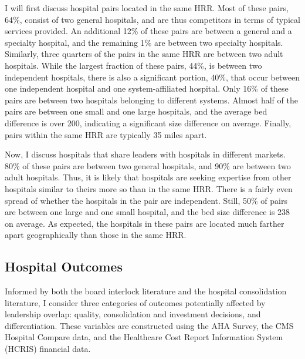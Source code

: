 \documentclass[12pt]{article}
\begin{document}
    I will first discuss hospital pairs located in the same HRR. Most of these pairs, 64\%, consist of two general hospitals, and are thus competitors in terms of typical services provided. An additional 12\% of these pairs are between a general and a specialty hospital, and the remaining 1\% are between two specialty hospitals. Similarly, three quarters of the pairs in the same HRR are between two adult hospitals. While the largest fraction of these pairs, 44\%, is between two independent hospitals, there is also a significant portion, 40\%, that occur between one independent hospital and one system-affiliated hospital. Only 16\% of these pairs are between two hospitals belonging to different systems. Almost half of the pairs are between one small and one large hospitals, and the average bed difference is over 200, indicating a significant size difference on average. Finally, pairs within the same HRR are typically 35 miles apart.

    Now, I discuss hospitals that share leaders with hospitals in different markets. 80\% of these pairs are between two general hospitals, and 90\% are between two adult hospitals. Thus, it is likely that hospitals are seeking expertise from other hospitals similar to theirs more so than in the same HRR. There is a fairly even spread of whether the hospitals in the pair are independent. Still, 50\% of pairs are between one large and one small hospital, and the bed size difference is 238 on average. As expected, the hospitals in these pairs are located much farther apart geographically than those in the same HRR. 

    \subsection{Hospital Outcomes}\label{sec:outcomes}

    Informed by both the board interlock literature and the hospital consolidation literature, I consider three categories of outcomes potentially affected by leadership overlap: quality, consolidation and investment decisions, and differentiation. These variables are constructed using the AHA Survey, the CMS Hospital Compare data, and the Healthcare Cost Report Information System (HCRIS) financial data.
\end{document}
